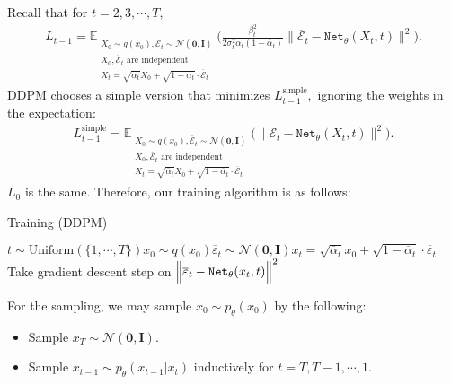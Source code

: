 \documentclass[
]{article}
\providecommand{\tightlist}{%
  \setlength{\itemsep}{0pt}\setlength{\parskip}{0pt}}\usepackage{longtable,booktabs,array}
\theoremstyle{remark}
\begin{document}
Recall that for \(t = 2,3,\cdots,T,\) \[
\begin{aligned}
  L_{t-1} = \mathbb E_{\substack{X_0\sim q(x_0), \overline{\mathcal{E}}_t\sim \mathcal{N}(\mathbf{0},\mathbf{I})\\ X_0,\overline{\mathcal{E}}_t \text{ are independent} \\ X_t=\sqrt{\overline{\alpha}_t}X_0+\sqrt{1-\overline{\alpha}_t}\cdot \overline{\mathcal{E}}_t}} \biggl( \frac{\beta_t^2}{2\sigma_t^2\alpha_t(1-\overline{\alpha}_t)} \Big\lVert \overline{\mathcal{E}}_t - \mathtt{Net}_{\theta}(X_t,t) \Big\rVert^2 \biggr).
\end{aligned}
\] DDPM chooses a simple version that minimizes
\(L_{t-1}^{\text{simple}},\) ignoring the weights in the expectation: \[
\begin{aligned}
  L_{t-1}^{\text{simple}} = \mathbb E_{\substack{X_0\sim q(x_0), \overline{\mathcal{E}}_t\sim \mathcal{N}(\mathbf{0},\mathbf{I})\\ X_0,\overline{\mathcal{E}}_t \text{ are independent} \\ X_t=\sqrt{\overline{\alpha}_t}X_0+\sqrt{1-\overline{\alpha}_t}\cdot \overline{\mathcal{E}}_t}} \biggl(  \Big\lVert \overline{\mathcal{E}}_t - \mathtt{Net}_{\theta}(X_t,t) \Big\rVert^2 \biggr).
\end{aligned}
\] \(L_0\) is the same. Therefore, our training algorithm is as follows:

\begin{algorithm}[H]
\caption{Training (DDPM)}
\label{alg-test-text-style}
\begin{algorithmic}[1]
\Repeat\State $t\sim \text{Uniform}(\lbrace 1,\cdots,T \rbrace)$\State $x_0\sim q(x_0)$\State $\overline{\varepsilon}_t\sim \mathcal{N}(\mathbf{0},\mathbf{I})$\State $x_t = \sqrt{\overline{\alpha}_t}x_0 + \sqrt{1-\overline{\alpha}_t}\cdot \overline{\varepsilon}_t$\State Take gradient descent step on $\Bigl\lVert \overline{\varepsilon}_t - \mathtt{Net}_{\theta}(x_t,t) \Bigr\rVert^2$
\end{algorithmic}
\end{algorithm}

For the sampling, we may sample \(x_0\sim p_{\theta}(x_0)\) by the
following:

\begin{itemize}
\tightlist
\item
  Sample \(x_T\sim \mathcal{N}(\mathbf{0},\mathbf{I}).\)
\item
  Sample \(x_{t-1}\sim p_{\theta}(x_{t-1}\vert x_t)\) inductively for
  \(t=T,T-1,\cdots,1.\)
\end{itemize}
\end{document}
